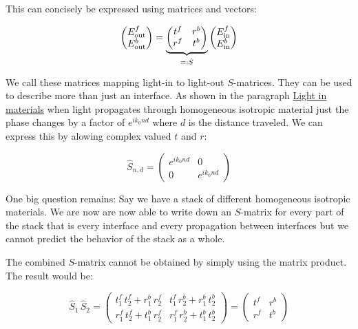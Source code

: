 This can concisely be expressed using matrices and vectors:

\begin{equation}
\begin{pmatrix}
    E^f_{\mathrm{out}} \\
    E^b_{\mathrm{out}}
\end{pmatrix} =
\underbrace{
\begin{pmatrix}
    t^f & r^b \\
    r^f & t^b
\end{pmatrix}
}_{
 =: \hat{S}
}
\begin{pmatrix}
    E^f_{\mathrm{in}} \\
    E^b_{\mathrm{in}}
\end{pmatrix}
\end{equation}

We call these matrices mapping light-in to light-out $S$-matrices. They can be used to describe more than just an interface. As shown in the paragraph \hyperref[par:light_in_materials]{Light in materials} when light propagates through homogeneous isotropic material just the phase changes by a factor of $e^{i k_0 n d}$ where $d$ is the distance traveled. We can express this by alowing complex valued $t$ and $r$:

\begin{equation}
    \hat S_{n, d} =
    \begin{pmatrix}
        e^{i k_0 n d} & 0 \\
        0 & e^{i k_0 n d}
    \end{pmatrix}
\end{equation}

One big question remains: Say we have a stack of different homogeneous isotropic materials. We are now are now able to write down an $S$-matrix for every part of the stack that is every interface and every propagation between interfaces but we cannot predict the behavior of the stack as a whole.


The combined $S$-matrix cannot be obtained by simply using the matrix product. The result would be:

\begin{equation}
    \hat S_1 \, \hat S_2 =
    \begin{pmatrix}
        t^f_1 \, t^f_2 + r^b_1 \, r^f_2 & t^f_1 \, r^b_2 + r^b_1 \, t^b_2 \\
        r^f_1 \, t^f_2 + t^b_1 \, r^f_2 & r^f_1 \, r^b_2 + t^b_1 \, t^b_2
    \end{pmatrix} = 
    \begin{pmatrix}
        t^f & r^b \\
        r^f & t^b
    \end{pmatrix}
\end{equation}
